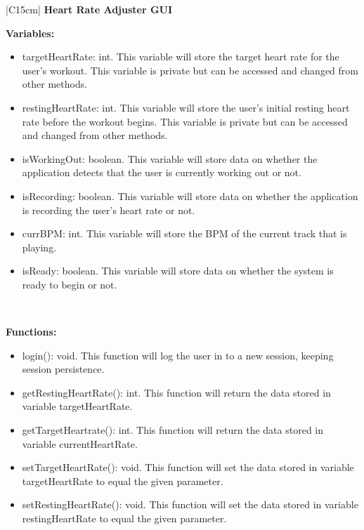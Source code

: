 \begin{center}
	\begin{tabular}{|C{15cm}|}
		\hline
			\textbf{Heart Rate Adjuster GUI} \\
		\hline
			\begin{flushleft}
				\textbf{Variables:} \\
			\end{flushleft}
				\begin{itemize}
					\item targetHeartRate: int. This variable will store the target heart rate for the user's workout. This variable is private but can be accessed and changed from other methods.
					\item restingHeartRate: int. This variable will store the user's initial resting heart rate before the workout begins. This variable is private but can be accessed and changed from other methods.
					\item isWorkingOut: boolean. This variable will store data on whether the application detects that the user is currently working out or not.
					\item isRecording: boolean. This variable will store data on whether the application is recording the user's heart rate or not.
					\item currBPM: int. This variable will store the BPM of the current track that is playing.
					\item isReady: boolean. This variable will store data on whether the system is ready to begin or not.
				\end{itemize} \\
			\hline
			\begin{flushleft}
				\textbf{Functions: } \\
			\end{flushleft}
				\begin{itemize}
					\item login(): void. This function will log the user in to a new session, keeping session persistence.
					\item getRestingHeartRate(): int. This function will return the data stored in variable targetHeartRate.
					\item getTargetHeartrate(): int. This function will return the data stored in variable currentHeartRate.
					\item setTargetHeartRate(): void. This function will set the data stored in variable targetHeartRate to equal the given parameter.
					\item setRestingHeartRate(): void. This function will set the data stored in variable restingHeartRate to equal the given parameter.

\end{itemize}
\end{tabular}
\end{center}
